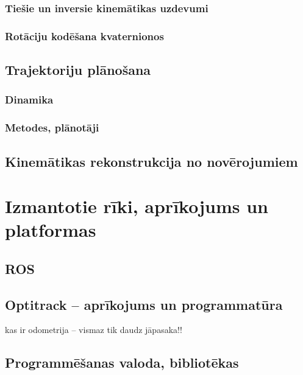 \documentclass[12pt, a4paper]{article}
\numberwithin{equation}{section} %
\begin{document}
\subsubsection{Tiešie un inversie kinemātikas uzdevumi}

\subsubsection{Rotāciju kodēšana kvaternionos}

\subsection{Trajektoriju plānošana}

\subsubsection{Dinamika}

\subsubsection{Metodes, plānotāji}

\subsection{Kinemātikas rekonstrukcija no novērojumiem}


%
%
%
%
%
%
%
%
%
%
%
%
%
%
%
%
%
%
%

\newpage
\section{Izmantotie rīki, aprīkojums un platformas}

\subsection{ROS}

\subsection{Optitrack -- aprīkojums un programmatūra}

kas ir odometrija -- vismaz tik daudz jāpasaka!!

\subsection{Programmēšanas valoda, bibliotēkas}
\end{document}
